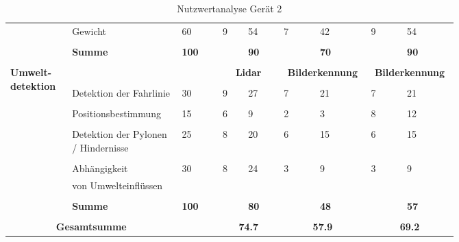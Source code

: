 \documentclass[main.tex]{subfiles} %
\begin{document}
\begin{landscape}
\begin{table}[ht]
\begin{tabular}{|p{0.11\linewidth}|p{0.18\linewidth}|p{0.085\linewidth}|p{0.057\linewidth}|p{0.07\linewidth}|p{0.057\linewidth}|p{0.07\linewidth}|p{0.057\linewidth}|p{0.07\linewidth}|}
            & Gewicht & 60 & 9 & 54 & 7 & 42 & 9 & 54 \\[1pt]
            \cline{2-9}
            &&&&&&&&\\[-9pt]
            & \textbf{Summe} & \textbf{100} &  & \textbf{90} &  & \textbf{70} &  & \textbf{90} \\[1pt]
            \hline
            \hline
            & \multicolumn{2}{c|}{} & \multicolumn{2}{c|}{} & \multicolumn{2}{c|}{} & \multicolumn{2}{c|}{} \\[-9pt]
            \multirow{6}{4em}{\textbf{Umwelt-detektion}} & \multicolumn{2}{c|}{} & \multicolumn{2}{c|}{\textbf{Lidar}} & \multicolumn{2}{c|}{\textbf{Bilderkennung}} & \multicolumn{2}{c|}{\textbf{Bilderkennung}} \\[1pt]
            \cline{2-9}
            &&&&&&&&\\[-9pt]
            & Detektion der Fahrlinie & 30 & 9 & 27 & 7 & 21 & 7 & 21 \\[1pt]
            \cline{2-9}
            &&&&&&&&\\[-9pt]
            & Positionsbestimmung & 15 & 6 & 9 & 2 & 3 & 8 & 12 \\[1pt]
            \cline{2-9}
            &&&&&&&&\\[-9pt]
            & Detektion der Pylonen / Hindernisse & 25 & 8 & 20 & 6 & 15 & 6 & 15 \\[1pt]
            \cline{2-9}
            &&&&&&&&\\[-9pt]
            & Abhängigkeit & 30 & 8 & 24 & 3 & 9 & 3 & 9 \\[1pt]
            & von Umwelteinflüssen &  &  &  &  &  &  &  \\[1pt]
            \cline{2-9}
            &&&&&&&&\\[-9pt]
            & \textbf{Summe} & \textbf{100} &  & \textbf{80} &  & \textbf{48} &  & \textbf{57} \\[1pt]
            \hline
            \hline
            \multicolumn{2}{|c|}{} &&\multicolumn{2}{c|}{}&\multicolumn{2}{c|}{}&\multicolumn{2}{c|}{} \\[-9pt]
            \multicolumn{2}{|c|}{\textbf{Gesamtsumme}} &  & \multicolumn{2}{c|}{\textbf{74.7}} & \multicolumn{2}{c|}{\textbf{57.9}} & \multicolumn{2}{c|}{\textbf{69.2}} \\[1pt]
            \hline
        \end{tabular}
    \caption{Nutzwertanalyse Gerät 2}
    \end{table}

\end{landscape} %
\end{document}
